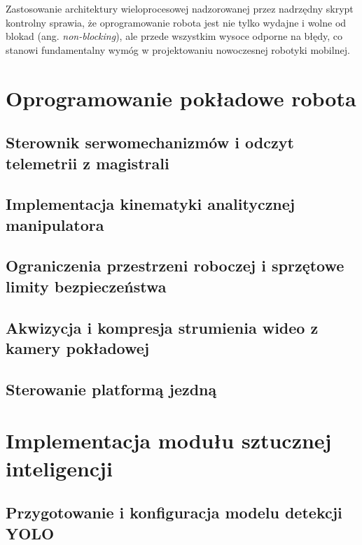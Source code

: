 \documentclass[11pt]{extreport}
\begin{document}
Zastosowanie architektury wieloprocesowej nadzorowanej przez nadrzędny skrypt kontrolny sprawia, że oprogramowanie robota jest nie tylko wydajne i wolne od blokad (ang. \textit{non-blocking}), ale przede wszystkim wysoce odporne na błędy, co stanowi fundamentalny wymóg w projektowaniu nowoczesnej robotyki mobilnej.


\chapter{Oprogramowanie pokładowe robota}
\section{Sterownik serwomechanizmów i odczyt telemetrii z magistrali} %
\section{Implementacja kinematyki analitycznej manipulatora} %
\section{Ograniczenia przestrzeni roboczej i sprzętowe limity bezpieczeństwa} %
\section{Akwizycja i kompresja strumienia wideo z kamery pokładowej} %
\section{Sterowanie platformą jezdną} %

\chapter{Implementacja modułu sztucznej inteligencji}
\section{Przygotowanie i konfiguracja modelu detekcji YOLO}
\end{document}
